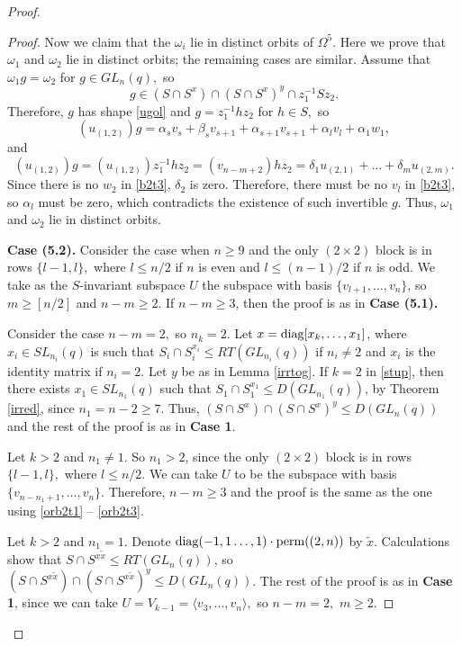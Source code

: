\begin{proof}
\begin{proof}
Now we claim that  the $\omega_i$ lie in distinct orbits of $\Omega^5.$ Here we prove that $\omega_1$ and $\omega_2$  lie in distinct orbits;  the remaining cases are similar.  Assume that $\omega_1 g =\omega_2$ for $g \in GL_n(q),$ so 
$$g \in (S \cap S^x) \cap (S \cap S^x)^y \cap z_1^{-1}Sz_2.$$
Therefore, $g$ has shape \eqref{ugol} and $g=z_1^{-1}hz_2$ for $h \in S,$ so 
\begin{equation}\label{b2t3}
(u_{(1,2)})g=\alpha_{s}v_s +\beta_s v_{s+1} + \alpha_{s+1} v_{s+1} +\alpha_{l}v_l+\alpha_1 w_1,
\end{equation}
and 
\begin{equation*}%
(u_{(1,2)})g=(u_{(1,2)})z_1^{-1}hz_2=(v_{n-m+2})hz_2 = \delta_1 u_{(2,1)} + \ldots + \delta_m u_{(2,m)}.
\end{equation*}
Since there is no $w_2$ in \eqref{b2t3}, $\delta_2$ is zero. Therefore, there must be no $v_l$ in \eqref{b2t3}, so $\alpha_l$ must be zero, which contradicts the existence of such invertible $g.$ Thus, $\omega_1$ and $\omega_2$ lie in  distinct orbits. 

\medskip

{\bf Case (5.2).} Consider the case when $n \ge 9$ and the only $(2\times 2)$ block is in  rows $\{l-1,l\},$ where $l \le n/2$ if $n$ is even and $l \le (n-1)/2$ if $n$ is odd. We take as the $S$-invariant subspace $U$ the subspace with  basis $\{v_{l+1}, \ldots, v_n\}$, so
$m\ge [n/2]$ and $n-m \ge 2.$  If $n-m \ge 3$, then the proof is  as in {\bf Case (5.1).} 

 Consider the case  $n-m=2,$ so $n_k=2$. Let $x= \mathrm{diag}[x_k, \ldots, x_1]$, where $x_i\in SL_{n_i}(q)$ is such that $S_i \cap S_i^{x_i} \le RT(GL_{n_i}(q))$ if $n_i \ne 2$ and $x_i$ is the identity matrix if $n_i=2.$ Let $y$ be as in Lemma \ref{irrtog}. If $k=2$ in \eqref{stup}, then there exists $x_1 \in SL_{n_1}(q)$ such that $S_1 \cap S_1^{x_1} \le D(GL_{n_1}(q))$, by %
Theorem \ref{irred}, since $n_1=n-2\ge 7.$ Thus, $(S\cap S^x) \cap (S\cap S^x)^y \le D(GL_n(q))$ and the rest of the proof is as in {\bf Case 1}.

Let $k>2$ and $n_1 \ne 1$. So $n_1 >2$, since the only $(2\times 2)$ block is in  rows $\{l-1,l\},$ where $l \le n/2$. %
We can take $U$ to be the subspace with  basis $\{v_{n -n_1+1}, \ldots, v_n\}$. Therefore, $n-m\ge 3$  and the proof is the same as the one using \eqref{orb2t1} -- \eqref{orb2t3}. 

Let $k>2$ and $n_1=1.$ Denote $\mathrm{diag}(-1,1\ldots,1) \cdot \mathrm{perm}((2,n))$ by $\tilde{x}$. Calculations show that  $S \cap S^{x \tilde{x}} \le RT(GL_n(q))$, so $(S \cap S^{x \tilde{x}}) \cap (S \cap S^{x \tilde{x}})^y\le D(GL_n(q))$. The rest of the proof is  as in {\bf Case 1}, since we can take $U=V_{k-1}=\langle v_3, \ldots, v_n \rangle,$ so $n-m=2,$ $m\ge 2.$


\end{proof}
\end{proof}
